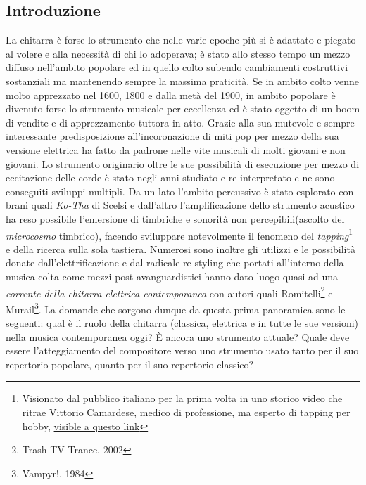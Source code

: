 \documentclass[oneside]{article}
\begin{document}
\newpage
\begin{multicols*}{2} %



\section{ Introduzione}
\noindent

La chitarra è forse lo strumento che nelle varie epoche più si è adattato e piegato al volere e alla necessità di chi lo adoperava; è stato allo stesso tempo un mezzo diffuso nell'ambito popolare ed in quello colto subendo cambiamenti costruttivi sostanziali ma mantenendo sempre la massima praticità. Se in ambito colto venne molto apprezzato nel 1600, 1800 e dalla metà del 1900, in ambito popolare è divenuto forse lo strumento musicale per eccellenza ed è stato oggetto di un boom di vendite  e di apprezzamento tuttora in atto. Grazie alla sua mutevole e sempre interessante predisposizione all’incoronazione di miti pop per mezzo della sua versione elettrica ha fatto da padrone nelle vite musicali di molti giovani e non giovani. Lo strumento originario oltre le sue possibilità di esecuzione per mezzo di eccitazione delle corde è stato negli anni studiato e re-interpretato e ne sono conseguiti sviluppi multipli. Da un lato l’ambito percussivo è stato esplorato con brani quali \textit{Ko-Tha} di Scelsi e dall’altro l’amplificazione dello strumento acustico ha reso possibile l’emersione di timbriche e sonorità non percepibili(ascolto del \textit{microcosmo} timbrico), facendo sviluppare notevolmente il fenomeno del \textit{tapping}\footnote{Visionato dal pubblico italiano per la prima volta in uno storico video che ritrae Vittorio Camardese, medico di professione, ma esperto di tapping per hobby, \href{https://www.youtube.com/watch?v=UmTQYquqxSY}{visible a questo link}} e della ricerca sulla sola tastiera. Numerosi sono inoltre gli utilizzi e le possibilità donate dall’elettrificazione e dal radicale re-styling che portati all’interno della musica colta come mezzi post-avanguardistici hanno dato luogo quasi ad una \textit{corrente della chitarra elettrica contemporanea} con autori quali Romitelli\footnote{Trash TV Trance, 2002} e Murail\footnote{Vampyr!, 1984}. 
La domande che sorgono dunque da questa prima panoramica sono le seguenti: qual è il ruolo della chitarra (classica, elettrica e in tutte le sue versioni) nella musica contemporanea oggi? È ancora uno strumento attuale? Quale deve essere l’atteggiamento del compositore verso uno strumento usato tanto per il suo repertorio popolare, quanto per il suo repertorio classico?


\end{multicols*}
\end{document}
